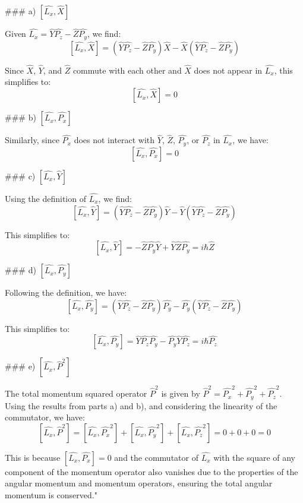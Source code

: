 ### a) \( [ \hat{L_{x}}, \hat{X} ] \)

Given \( \hat{L_{x}} = \hat{Y}\hat{P_{z}} - \hat{Z}\hat{P_{y}} \), we find:
\[ [ \hat{L_{x}}, \hat{X} ] = (\hat{Y}\hat{P_{z}} - \hat{Z}\hat{P_{y}})\hat{X} - \hat{X}(\hat{Y}\hat{P_{z}} - \hat{Z}\hat{P_{y}}) \]

Since \( \hat{X} \), \( \hat{Y} \), and \( \hat{Z} \) commute with each other and \( \hat{X} \) does not appear in \( \hat{L_{x}} \), this simplifies to:
\[ [ \hat{L_{x}}, \hat{X} ] = 0 \]

### b) \( [ \hat{L_{x}}, \hat{P_{x}} ] \)

Similarly, since \( \hat{P_{x}} \) does not interact with \( \hat{Y} \), \( \hat{Z} \), \( \hat{P_{y}} \), or \( \hat{P_{z}} \) in \( \hat{L_{x}} \), we have:
\[ [ \hat{L_{x}}, \hat{P_{x}} ] = 0 \]

### c) \( [ \hat{L_{x}}, \hat{Y} ] \)

Using the definition of \( \hat{L_{x}} \), we find:
\[ [ \hat{L_{x}}, \hat{Y} ] = (\hat{Y}\hat{P_{z}} - \hat{Z}\hat{P_{y}})\hat{Y} - \hat{Y}(\hat{Y}\hat{P_{z}} - \hat{Z}\hat{P_{y}}) \]

This simplifies to:
\[ [ \hat{L_{x}}, \hat{Y} ] = -\hat{Z}\hat{P_{y}}\hat{Y} + \hat{Y}\hat{Z}\hat{P_{y}} = i\hbar\hat{Z} \]

### d) \( [ \hat{L_{x}}, \hat{P_{y}} ] \)

Following the definition, we have:
\[ [ \hat{L_{x}}, \hat{P_{y}} ] = (\hat{Y}\hat{P_{z}} - \hat{Z}\hat{P_{y}})\hat{P_{y}} - \hat{P_{y}}(\hat{Y}\hat{P_{z}} - \hat{Z}\hat{P_{y}}) \]

This simplifies to:
\[ [ \hat{L_{x}}, \hat{P_{y}} ] = \hat{Y}\hat{P_{z}}\hat{P_{y}} - \hat{P_{y}}\hat{Y}\hat{P_{z}} = i\hbar\hat{P_{z}} \]

### e) \( [ \hat{L_{x}}, \hat{P}^{2} ] \)

The total momentum squared operator \( \hat{P}^{2} \) is given by \( \hat{P}^{2} = \hat{P_{x}}^{2} + \hat{P_{y}}^{2} + \hat{P_{z}}^{2} \). Using the results from parts a) and b), and considering the linearity of the commutator, we have:
\[ [ \hat{L_{x}}, \hat{P}^{2} ] = [ \hat{L_{x}}, \hat{P_{x}}^{2} ] + [ \hat{L_{x}}, \hat{P_{y}}^{2} ] + [ \hat{L_{x}}, \hat{P_{z}}^{2} ] = 0 + 0 + 0 = 0 \]

This is because \( [ \hat{L_{x}}, \hat{P_{x}} ] = 0 \) and the commutator of \( \hat{L_{x}} \) with the square of any component of the momentum operator also vanishes due to the properties of the angular momentum and momentum operators, ensuring the total angular momentum is conserved."

